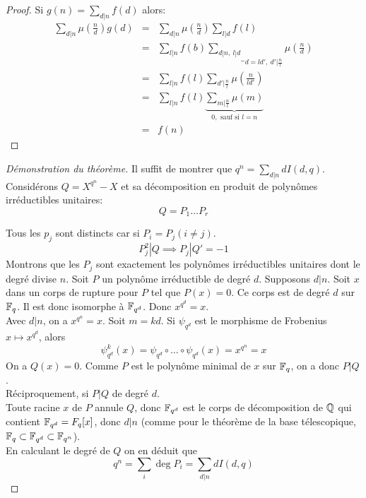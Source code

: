 \begin{proof}
	Si $g(n) = \sum_{d|n} f(d)$ alors:
	\begin{eqnarray*}
		\sum_{d|n} \mu(\frac n d) g(d) &=& \sum_{d|n} \mu(\frac n d) \sum_{l|d} f(l) \\
		&=& \sum_{l|n} f(b) \underbrace{\sum_{d|n,\ l|d}}_{ d = ld', \ d' | \frac n l} \mu(\frac n d) \\
		&=& \sum_{l | n} f(l) \sum_{d' | \frac n l} \mu(\frac n {ld'}) \\
		&=& \sum_{l | n} f(l) \underbrace{\sum_{m | \frac n l} \mu(m)}_{ 0, \text{ sauf si } l = n } \\
		&=& f(n)
	\end{eqnarray*}
\end{proof}

\begin{proof}[Démonstration du théorème]
	Il suffit de montrer que $q^n = \sum_{d|n} d I(d,q)$.\\

	Considérons $Q = X^{q^n} - X$ et sa décomposition en produit de polynômes irréductibles unitaires:
	$$ Q = P_1 \ldots P_r$$

	Tous les $p_j$ sont distincts car si $P_i = P_j (i \neq j)$.\\
	$$P_j^2 | Q \implies P_j | Q' = - 1$$
	Montrons que les $P_j$ sont exactement les polynômes irréductibles unitaires dont le degré divise $n$. Soit $P$ un
	polynôme irréductible de degré $d$. Supposons $d | n$. Soit $x$ dans un corps de rupture pour $P$ tel que $P(x) = 0$.
	Ce corps est de degré $d$ sur $\mathbb{F}_q$. Il est donc isomorphe à $\mathbb{F}_{q^d}$. Donc $x^{q^d} = x$.\\
	Avec $d|n$, on a $x^{q^n} = x$. Soit $m = kd$. Si $\psi_{q^d}$ est le morphisme de Frobenius $x \mapsto x^{q^d}$, alors
	$$\psi_{q^d}^k(x) = \psi_{q^d} \circ \dots \circ \psi_{q^d}(x) = x^{q^n} = x$$
	On a $Q(x) = 0$. Comme $P$ est le polynôme minimal de $x$ sur $\mathbb{F}_q$, on a donc $P | Q$.\\

	Réciproquement, si $P | Q$ de degré $d$.\\
	Toute racine $x$ de $P$ annule $Q$, donc $\mathbb{F}_{q^d}$ est le corps de décomposition de $\mathbb{Q}$ qui contient $\mathbb{F}_{q^d} = F_q[x]$, donc
	$d | n$ (comme pour le théorème de la base télescopique, $\mathbb{F}_q \subset \mathbb{F}_{q^d} \subset \mathbb{F}_{q^n}$).\\

	En calculant le degré de $Q$ on en déduit que
	$$q^n = \sum_i \deg P_i = \sum_{d|n} d I(d,q)$$
\end{proof}


